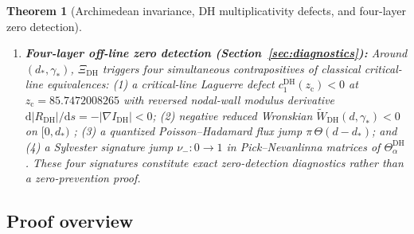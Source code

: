 \documentclass[11pt,reqno]{amsart}
\newtheorem{theorem}{Theorem}[section]
\theoremstyle{definition}
\theoremstyle{remark}
\numberwithin{equation}{section}
\newcommand{\dd}{\mathrm{d}}
\begin{document}
\begin{theorem}[Archimedean invariance, DH multiplicativity defects, and four-layer zero detection]
\begin{enumerate}[label=\textup{(\roman*)},leftmargin=2.3em]
  at $N \in \{4,6,9,14\}$. While $\zeta(s)$ and $\mathcal{D}_{\mathrm{DH}}(s)$ both have unit-modulus composite coefficients $|a(4)|=|a(6)|=1$, $\mathcal{D}_{\mathrm{DH}}(s)$ has suppressed prime coefficients $|a_{\mathrm{DH}}(2)|=|a_{\mathrm{DH}}(3)|=\kappa \approx 0.28408$, amplifying $|a_{\mathrm{DH}}(4)|/\kappa^2 \approx 12.39143$ relative to multiplicative scaling. At $(d_*,\gamma_*)$ with $N_5(\gamma_*)=8$, prime modes $p\in\{2,3,5,7\}$ provide $38.81780\%$ of $|T_1^{(\mathrm{DH})}|$, composite modes $n\in\{4,6,8\}$ provide $54.02700\%$, and the truncated 8-mode sum retains a non-zero residual $|T_{1..8}^{(\mathrm{DH})}(d_*,\gamma_*)| = 0.17345$ ($7.25126\%$ of $|T_1^{(\mathrm{DH})}|$), cancelled only by the Riemann--Siegel remainder $\mathcal{R}_8^{(\mathrm{DH})}$.
  \item \textbf{Four-layer off-line zero detection (Section~\ref{sec:diagnostics}):} Around $(d_*,\gamma_*)$, $\Xi_{\mathrm{DH}}$ triggers four simultaneous contrapositives of classical critical-line equivalences: (1) a critical-line Laguerre defect $c_1^{\mathrm{DH}}(z_{\mathrm{c}}) < 0$ at $z_{\mathrm{c}} = 85.7472008265$ \cite{jensen1913,csordas1994} with reversed nodal-wall modulus derivative $\dd|R_{\mathrm{DH}}|/\dd s = -|\nabla I_{\mathrm{DH}}| < 0$; (2) negative reduced Wronskian $\widetilde{W}_{\mathrm{DH}}(d,\gamma_*) < 0$ on $[0,d_*)$ \cite{hinkkanen1997,lagarias1999}; (3) a quantized Poisson--Hadamard flux jump $\pi\,\Theta(d - d_*)$; and (4) a Sylvester signature jump $\nu_- : 0 \to 1$ in Pick--Nevanlinna matrices of $\Theta_\alpha^{\mathrm{DH}}$ \cite{debranges1968}. These four signatures constitute exact zero-detection diagnostics rather than a zero-prevention proof.
\end{enumerate}
\end{theorem}

\subsection{Proof overview}
\label{subsec:proof-overview}
\end{document}
